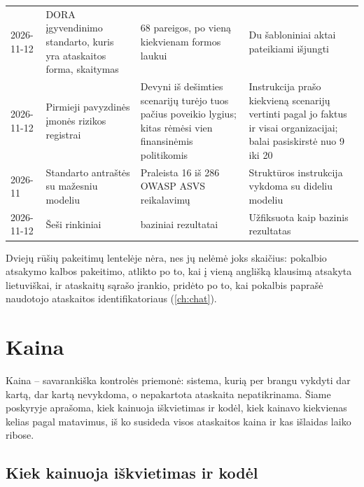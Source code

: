 \begin{xltabular}{\textwidth}{@{}L{17mm}L{37mm}YL{37mm}@{}}
2026-11-12 & DORA įgyvendinimo standarto, kuris yra ataskaitos forma, skaitymas & 68 pareigos, po vieną kiekvienam formos laukui & Du šabloniniai aktai pateikiami išjungti \\
2026-11-12 & Pirmieji pavyzdinės įmonės rizikos registrai & Devyni iš dešimties scenarijų turėjo tuos pačius poveikio lygius; kitas rėmėsi vien finansinėmis politikomis & Instrukcija prašo kiekvieną scenarijų vertinti pagal jo faktus ir visai organizacijai; balai pasiskirstė nuo 9 iki 20 \\
2026-11 & Standarto antraštės su mažesniu modeliu & Praleista 16 iš 286 OWASP ASVS reikalavimų & Struktūros instrukcija vykdoma su dideliu modeliu \\
2026-11-12 & Šeši rinkiniai &  baziniai rezultatai & Užfiksuota kaip bazinis rezultatas \\
\end{xltabular}

Dviejų rūšių pakeitimų lentelėje nėra, nes jų nelėmė joks skaičius: pokalbio atsakymo kalbos
pakeitimo, atlikto po to, kai į vieną anglišką klausimą atsakyta lietuviškai, ir ataskaitų
sąrašo įrankio, pridėto po to, kai pokalbis paprašė naudotojo ataskaitos identifikatoriaus
(\cref{ch:chat}).


\section{Kaina}\label{sec:control:cost}

Kaina -- savarankiška kontrolės priemonė: sistema, kurią per brangu vykdyti dar kartą, dar
kartą nevykdoma, o nepakartota ataskaita nepatikrinama. Šiame poskyryje aprašoma, kiek
kainuoja iškvietimas ir kodėl, kiek kainavo kiekvienas kelias pagal matavimus, iš ko susideda
visos ataskaitos kaina ir kas išlaidas laiko ribose.

\subsection{Kiek kainuoja iškvietimas ir kodėl}

